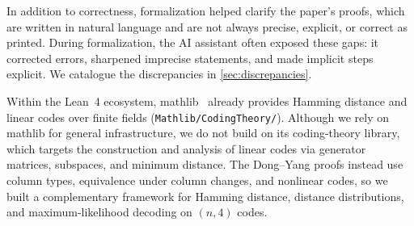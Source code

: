 \documentclass[12pt]{article}
\begin{document}
In addition to correctness, formalization helped clarify the paper's
proofs, which are written in natural language and are not always precise,
explicit, or correct as printed.
During formalization, the AI assistant often exposed these gaps: it corrected
errors, sharpened imprecise statements, and made implicit steps explicit.
We catalogue the discrepancies in \cref{sec:discrepancies}.



Within the Lean~4 ecosystem, mathlib~\cite{mathlib} already provides Hamming
distance and linear codes over finite fields
(\texttt{Mathlib/CodingTheory/}).
Although we rely on mathlib for general infrastructure, we do not build on
its coding-theory library, which targets the construction and analysis of
linear codes via generator matrices, subspaces, and minimum distance.
The Dong--Yang proofs instead use column types, equivalence under column
changes, and nonlinear codes, so we built a complementary framework for
Hamming distance, distance distributions, and maximum-likelihood decoding
on $(n,4)$ codes.
\end{document}
